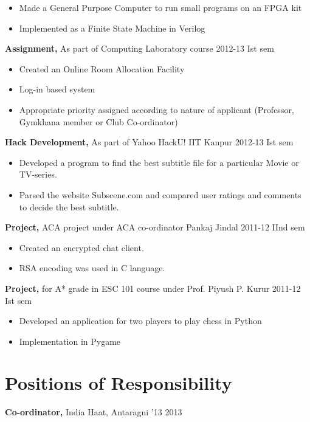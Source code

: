 \documentclass[margin]{res}
\begin{document}
\begin{resume}
		\begin{itemize} \itemsep -2pt
		\item Made a General Purpose Computer to run small programs on an FPGA kit
		\item Implemented as a Finite State Machine in Verilog
\end{itemize}				
 
{\bf Assignment,} As part of Computing Laboratory course \hfill  2012-13 Ist sem
\begin{itemize} \itemsep -2pt %
\item Created an Online Room Allocation Facility
\item Log-in based system
\item Appropriate priority assigned according to nature of applicant (Professor, Gymkhana member or Club Co-ordinator)
\end{itemize}

{\bf Hack Development,} As part of Yahoo HackU! IIT Kanpur \hfill 2012-13 Ist sem
		\begin{itemize} \itemsep -2pt
			\item Developed a program to find the best subtitle file for a particular Movie or TV-series.
			\item Parsed the website Subscene.com and compared user ratings and comments to decide the best subtitle.
		\end{itemize}

 {\bf Project,} ACA project under ACA co-ordinator Pankaj Jindal \hfill 2011-12 IInd sem
 \begin{itemize} \itemsep -2pt  %
 \item Created an encrypted chat client.
 \item RSA encoding was used in C language.
 \end{itemize}

 {\bf Project, } for A* grade in ESC 101 course under Prof. Piyush P. Kurur		\hfill 2011-12 Ist sem
 	\begin{itemize} \itemsep -2pt
 		\item Developed an application for two players to play chess in Python
 		\item Implementation in Pygame
 	\end{itemize}
 

\section{Positions of Responsibility} 
               {\bf Co-ordinator,} India Haat, Antaragni '13    \hfill         2013
          \begin{itemize}\itemsep -2pt
          

\end{itemize}
\end{resume}
\end{document}
